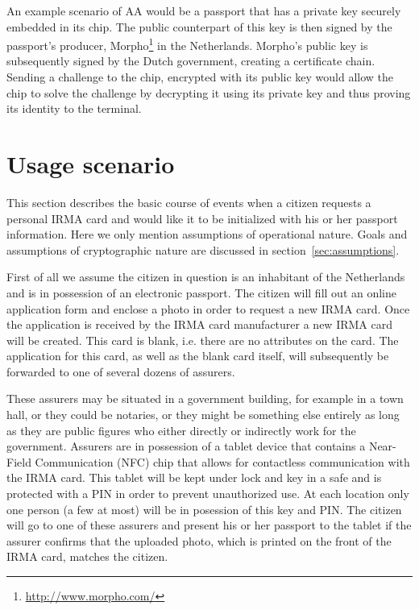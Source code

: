An example scenario of AA would be a passport that has a private key securely embedded in its chip. The public counterpart of this key is then signed by the passport's producer, Morpho\footnote{\url{http://www.morpho.com/}} in the Netherlands. Morpho's public key is subsequently signed by the Dutch government, creating a certificate chain. Sending a challenge to the chip, encrypted with its public key would allow the chip to solve the challenge by decrypting it using its private key and thus proving its identity to the terminal.

\section{Usage scenario}
\label{subsec:bcoe}
This section describes the basic course of events when a citizen requests a personal IRMA card and would like it to be initialized with his or her passport information. Here we only mention assumptions of operational nature. Goals and assumptions of cryptographic nature are discussed in section~\ref{sec:assumptions}. 

First of all we assume the citizen in question is an inhabitant of the Netherlands and is in possession of an electronic passport. The citizen will fill out an online application form and enclose a photo in order to request a new IRMA card. Once the application is received by the IRMA card manufacturer a new IRMA card will be created. This card is blank, i.e. there are no attributes on the card. The application for this card, as well as the blank card itself, will subsequently be forwarded to one of several dozens of assurers. 

These assurers may be situated in a government building, for example in a town hall, or they could be notaries, or they might be something else entirely as long as they are public figures who either directly or indirectly work for the government. Assurers are in possession of a tablet device that contains a Near-Field Communication (NFC) chip that allows for contactless communication with the IRMA card. This tablet will be kept under lock and key in a safe and is protected with a PIN in order to prevent unauthorized use. At each location only one person (a few at most) will be in posession of this key and PIN. The citizen will go to one of these assurers and present his or her passport to the tablet if the assurer confirms that the uploaded photo, which is printed on the front of the IRMA card, matches the citizen. 


